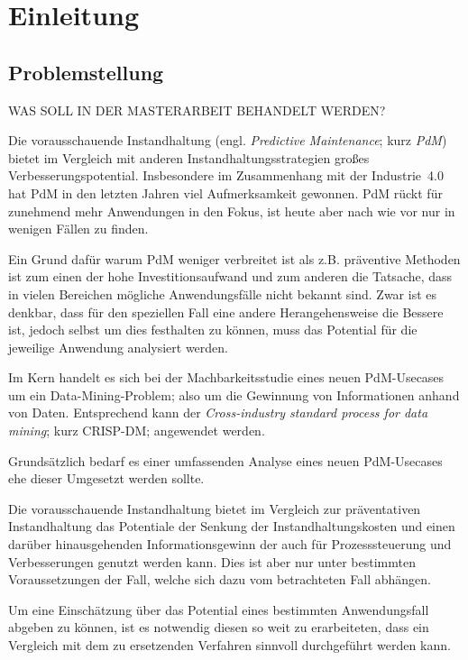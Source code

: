 \chapter{Einleitung}
\label{ch:einleitung}

\section{Problemstellung}
\label{sec:motivation}
WAS SOLL IN DER MASTERARBEIT BEHANDELT WERDEN?

Die vorausschauende Instandhaltung (engl. \textit{Predictive Maintenance}; kurz \textit{PdM}) bietet im Vergleich mit anderen Instandhaltungsstrategien großes Verbesserungspotential. Insbesondere im Zusammenhang mit der Industrie~{4.0} hat PdM in den letzten Jahren viel Aufmerksamkeit gewonnen. PdM rückt für zunehmend mehr Anwendungen in den Fokus, ist heute aber nach wie vor nur in wenigen Fällen zu finden. 

Ein Grund dafür warum PdM weniger verbreitet ist als z.B. präventive Methoden ist zum einen der hohe Investitionsaufwand und zum anderen die Tatsache, dass in vielen Bereichen mögliche Anwendungsfälle nicht bekannt sind. Zwar ist es denkbar, dass für den speziellen Fall eine andere Herangehensweise die Bessere ist, jedoch selbst um dies festhalten zu können, muss das Potential für die jeweilige Anwendung analysiert werden. 

Im Kern handelt es sich bei der Machbarkeitsstudie eines neuen PdM-Usecases um ein Data-Mining-Problem; also um die Gewinnung von Informationen anhand von Daten. Entsprechend kann der \textit{Cross-industry standard process for data mining}; kurz CRISP-DM; angewendet werden.

Grundsätzlich bedarf es einer umfassenden Analyse eines neuen PdM-Usecases ehe dieser Umgesetzt werden sollte.

Die vorausschauende Instandhaltung bietet im Vergleich zur präventativen Instandhaltung das Potentiale der Senkung der Instandhaltungskosten und einen darüber hinausgehenden Informationsgewinn der auch für Prozesssteuerung und Verbesserungen genutzt werden kann. Dies ist aber nur unter bestimmten Voraussetzungen der Fall, welche sich dazu vom betrachteten Fall abhängen.

Um eine Einschätzung über das Potential eines bestimmten Anwendungsfall abgeben zu können, ist es notwendig diesen so weit zu erarbeiteten, dass ein Vergleich mit dem zu ersetzenden Verfahren sinnvoll durchgeführt werden kann.

